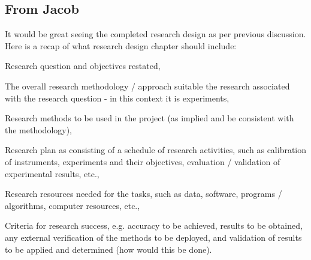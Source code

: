 \subsection{From Jacob}
It would be great seeing the completed research design as per previous discussion.
Here is a recap of what research design chapter should include: 
\begin{todolist}
    \item Research question and objectives restated, 
    \item The overall research methodology / approach suitable the research associated with the research question - in this context it is experiments, 
    \item Research methods to be used in the project (as implied and be consistent with the methodology), 
    \item Research plan as consisting of a schedule of research activities, such as calibration of instruments, experiments and their objectives, evaluation / validation of experimental results, etc., 
    \item Research resources needed for the tasks, such as data, software, programs / algorithms, computer resources, etc., 
    \item Criteria for research success, e.g. accuracy to be achieved, results to be obtained, any external verification of the methods to be deployed, and validation of results to be applied and determined (how would this be done).
\end{todolist}